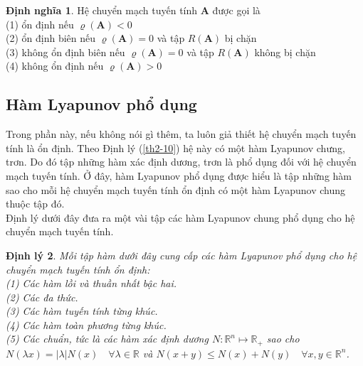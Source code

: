 \documentclass[14pt,a4paper,oneside]{report}		%
\newtheorem{theorem}{Định lý}[chapter]\theoremstyle{definition}
\newtheorem{define}[theorem]{Định nghĩa}
\begin{document}
\begin{define}\label{def2-17}
Hệ chuyển mạch tuyến tính $\mathbf{A}$ được gọi là \\
(1) ổn định nếu $\varrho(\mathbf{A})<0$\\
(2) ổn định biên nếu $\varrho(\mathbf{A})=0$ và tập $R(\mathbf{A})$ bị chặn\\
(3) không ổn định biên nếu $\varrho(\mathbf{A})=0$ và tập $R(\mathbf{A})$ không bị chặn\\
(4) không ổn định nếu $\varrho(\mathbf{A})>0$
\end{define}

\subsection{Hàm Lyapunov phổ dụng}
Trong phần này, nếu không nói gì thêm, ta luôn giả thiết hệ chuyển mạch tuyến tính là ổn định. Theo Định lý (\ref{th2-10}) hệ này có một hàm Lyapunov chưng, trơn. Do đó tập những hàm xác định dương, trơn là phổ dụng đối với hệ chuyển mạch tuyến tính. Ở đây, hàm Lyapunov phổ dụng được hiểu là tập những hàm sao cho mỗi hệ chuyển mạch tuyến tính ổn định có một hàm Lyapunov chung thuộc tập đó.\\

Định lý dưới đây đưa ra một vài tập các hàm Lyapunov chung phổ dụng cho hệ chuyển mạch tuyến tính.

\begin{theorem} \label{the2-18}
Mỗi tập hàm dưới đây cung cấp các hàm Lyapunov phổ dụng cho hệ chuyển mạch tuyến tính ổn định:\\
(1) Các hàm lồi và thuần nhất bậc hai.\\
(2) Các đa thức.\\
(3) Các hàm tuyến tính từng khúc.\\
(4) Các hàm toàn phương từng khúc.\\
(5) Các chuẩn, tức là các hàm xác định dương $N:\mathbb{R}^n\mapsto\mathbb{R}_+$ sao cho $N(\lambda x)=|\lambda|N(x)\quad\forall\lambda\in\mathbb{R}$ và $N(x+y)\leq N(x)+N(y)\quad\forall x,y\in\mathbb{R}^n$.
\end{theorem}
\end{document}
